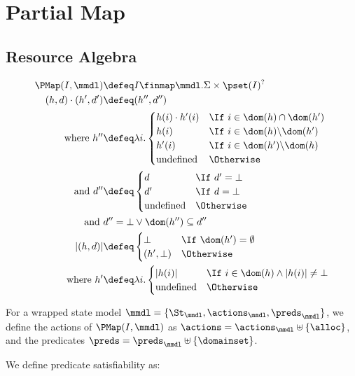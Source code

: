 \section{Partial Map} \label{proofs:pmap-soundness}

\subsection{Resource Algebra}

\begin{align*}
	\PMap(I,\mmdl) &\defeq I \finmap \mmdl.\Sigma \times \pset(I)^?\\
	(h,d)\cdot (h',d') &\defeq (h'', d'') \\
	\text{where } h''&\defeq \lambda i.\begin{cases}
		h(i)\cdot h'(i)&\If~i\in \dom(h)\cap\dom(h')\\
		h(i) &\If~i\in \dom(h) \backslash \dom(h')\\
		h'(i) &\If~i\in \dom(h') \backslash \dom(h)\\
		\text{undefined}&\Otherwise
	\end{cases}\\
	\text{and }d''&\defeq\begin{cases}
		d&\If~d'=\bot\\
		d'&\If~d=\bot\\
		\text{undefined}&\Otherwise
	\end{cases}\\
	\text{and }& d'' = \bot \lor \dom(h'')\subseteq d''\\
	|(h, d)| &\defeq \begin{cases}
		\bot &\If~\dom(h')=\emptyset\\
		(h', \bot) &\Otherwise
	\end{cases}\\
	\text{where }h'&\defeq \lambda i.\begin{cases}
		|h(i)| &\If~ i\in\dom(h) \land |h(i)| \neq \bot\\
		\text{undefined} &\Otherwise
	\end{cases}
\end{align*}

For a wrapped state model $\mmdl=\{\St_\mmdl,\actions_\mmdl,\preds_\mmdl\}$, we define the actions of $\PMap(I,\mmdl)$ as $\actions=\actions_\mmdl \uplus \{\alloc\}$, and the predicates $\preds=\preds_\mmdl\uplus\{\domainset\}$.
  
We define predicate satisfiability as:

